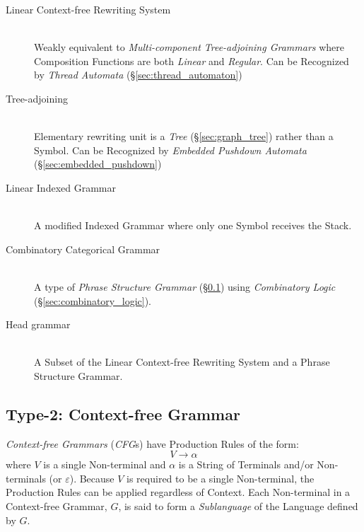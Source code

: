 \begin{description}
\item[Linear Context-free Rewriting System] \hfill \\
    Weakly equivalent to \emph{Multi-component Tree-adjoining
      Grammars} where Composition Functions are both \emph{Linear} and
    \emph{Regular}. Can be Recognized by \emph{Thread
      Automata} (\S\ref{sec:thread_automaton})\cite{villemonte02}

\item[Tree-adjoining] \hfill \\
    Elementary rewriting unit is a \emph{Tree}
    (\S\ref{sec:graph_tree}) rather than a Symbol. Can be Recognized
    by \emph{Embedded Pushdown Automata}
    (\S\ref{sec:embedded_pushdown})\cite{vijayashanker88}

\item[Linear Indexed Grammar] \hfill \\
    A modified Indexed Grammar where only one Symbol receives the
    Stack.

\item[Combinatory Categorical Grammar] \hfill \\
    A type of \emph{Phrase Structure Grammar}
    (\S\ref{sec:context_free}) using \emph{Combinatory Logic}
    (\S\ref{sec:combinatory_logic}).

\item[Head grammar] \hfill \\
    A Subset of the Linear Context-free Rewriting System and a Phrase
    Structure Grammar.

\end{description}



\subsection{Type-2: Context-free Grammar}\label{sec:context_free}

\emph{Context-free Grammars} (\emph{CFG}s) have Production Rules of
the form:
\[
    V \rightarrow \alpha
\]
where $V$ is a single Non-terminal and $\alpha$ is a String of Terminals
and/or Non-terminals (or $\varepsilon$). Because $V$ is required to be a
single Non-terminal, the Production Rules can be applied regardless of
Context. Each Non-terminal in a Context-free Grammar, $G$, is said to
form a \emph{Sublanguage} of the Language defined by $G$.

